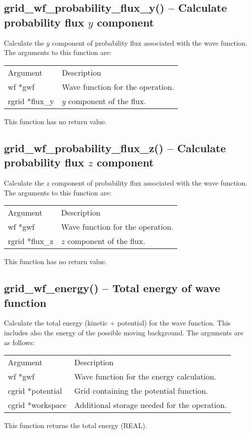 \documentclass[12pt,letterpaper]{report}
\begin{document}
\subsection{grid\_wf\_probability\_flux\_y() -- Calculate probability flux $y$ component}

Calculate the $y$ component of probability flux associated with the wave function. The arguments to this function are:
\begin{longtable}{p{} p{}}
Argument & Description\\
\cline{1-2}
wf *gwf & Wave function for the operation.\\
rgrid *flux\_y & $y$ component of the flux.\\
\end{longtable}
\noindent
This function has no return value.

\subsection{grid\_wf\_probability\_flux\_z() -- Calculate probability flux $z$ component}

Calculate the $z$ component of probability flux associated with the wave function. The arguments to this function are:
\begin{longtable}{p{} p{}}
Argument & Description\\
\cline{1-2}
wf *gwf & Wave function for the operation.\\
rgrid *flux\_z & $z$ component of the flux.\\
\end{longtable}
\noindent
This function has no return value.

\subsection{grid\_wf\_energy() -- Total energy of wave function}

Calculate the total energy (kinetic + potential) for the wave function. This includes also the energy of the possible moving background. The arguments are as follows:
\begin{longtable}{p{} p{}}
Argument & Description\\
\cline{1-2}
wf *gwf & Wave function for the energy calculation.\\
cgrid *potential & Grid containing the potential function.\\
cgrid *workspace & Additional storage needed for the operation.\\
\end{longtable}
\noindent
This function returns the total energy (REAL).
\end{document}
